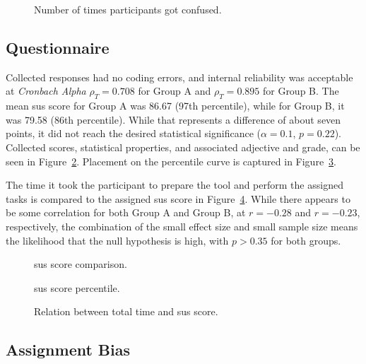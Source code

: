 \begin{figure}[H]
    
    \caption{Number of times participants got confused.}
    \label{fig:plot-boxplot}
\end{figure}

\subsection{Questionnaire}
\label{sec:evaluation-questionnaire}

Collected responses had no coding errors, and internal reliability was acceptable at \emph{Cronbach Alpha} $\rho_T=0.708$ for Group A and $\rho_T=0.895$ for Group B.
The mean \gls{sus} score for Group A was 86.67 (97th percentile), while for Group B, it was 79.58 (86th percentile).
While that represents a difference of about seven points, it did not reach the desired statistical significance ($\alpha=0.1$, $p=0.22$).
Collected scores, statistical properties, and associated adjective and grade, can be seen in Figure~\ref{fig:plot-sus}.
Placement on the percentile curve is captured in Figure~\ref{fig:plot-sus-percentile}.

The time it took the participant to prepare the tool and perform the assigned tasks is compared to the assigned \gls{sus} score in Figure~\ref{fig:plot-sus-time}.
While there appears to be some correlation for both Group A and Group B, at $r=-0.28$ and $r=-0.23$, respectively, the combination of the small effect size and small sample size means the likelihood that the null hypothesis is high, with $p > 0.35$ for both groups.

\begin{figure}[H]
    
    \caption{\gls{sus} score comparison.}
    \label{fig:plot-sus}
\end{figure}

\begin{figure}[H]
    
    \caption{\gls{sus} score percentile.}
    \label{fig:plot-sus-percentile}
\end{figure}

\begin{figure}[H]
    
    \caption{Relation between total time and \gls{sus} score.}
    \label{fig:plot-sus-time}
\end{figure}

\subsection{Assignment Bias}

